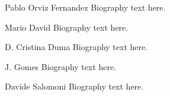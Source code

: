 \documentclass[journal]{IEEEtran}
\begin{document}
\begin{IEEEbiography}{Pablo Orviz Fernandez}
Biography text here.
\end{IEEEbiography}

\begin{IEEEbiography}{Mario David}
Biography text here.
\end{IEEEbiography}

\begin{IEEEbiography}{D. Cristina Duma}
Biography text here.
\end{IEEEbiography}


\begin{IEEEbiography}{J. Gomes}
Biography text here.
\end{IEEEbiography}

\begin{IEEEbiography}{Davide Salomoni}
Biography text here.
\end{IEEEbiography}
\end{document}
